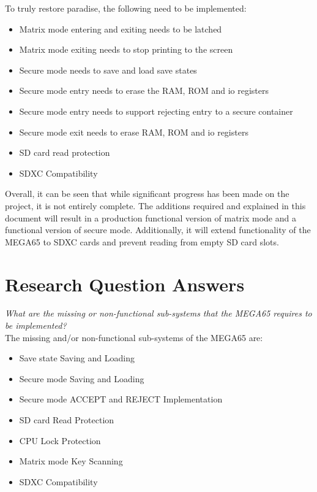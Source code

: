 To truly restore paradise, the following need to be implemented:
\begin{itemize}
\item{Matrix mode entering and exiting needs to be latched}
\item{Matrix mode exiting needs to stop printing to the screen}
\item{Secure mode needs to save and load save states}
\item{Secure mode entry needs to erase the RAM, ROM and io registers}
\item{Secure mode entry needs to support rejecting entry to a secure container}
\item{Secure mode exit needs to erase RAM, ROM and io registers}
\item{SD card read protection}
\item{SDXC Compatibility}
\end{itemize}

Overall, it can be seen that while significant progress has been made on the project, it is not entirely complete. The additions required and explained in this document will result in a production functional version of matrix mode and a functional version of secure mode. Additionally, it will extend functionality of the MEGA65 to SDXC cards and prevent reading from empty SD card slots.


\section{Research Question Answers}

\label{Ch9 Sec2}

\textit{What are the missing or non-functional sub-systems that the MEGA65 requires to be implemented?}\\
The missing and/or non-functional sub-systems of the MEGA65 are:
\begin{itemize}
\item{Save state Saving and Loading}
\item{Secure mode Saving and Loading}
\item{Secure mode ACCEPT and REJECT Implementation}
\item{SD card Read Protection}
\item{CPU Lock Protection}
\item{Matrix mode Key Scanning}
\item{SDXC Compatibility}
\end{itemize}

